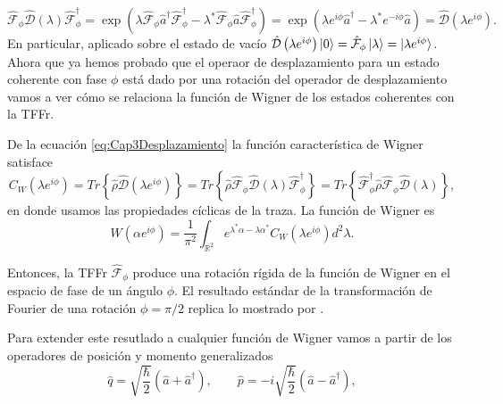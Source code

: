                 \begin{equation}\label{eq:Cap3Desplazamiento}
                    \hat{\mathcal{F}}_\phi \hat{\mathcal{D}}(\lambda) \hat{\mathcal{F}}_\phi^\dagger = \exp\left(\lambda \hat{\mathcal{F}}_\phi \hat{a}^\dagger \hat{\mathcal{F}}_\phi^\dagger - \lambda^* \hat{\mathcal{F}}_\phi \hat{a}\hat{\mathcal{F}}_\phi^\dagger \right) = \exp\left( \lambda e^{i\phi}\hat{a}^\dagger - \lambda^* e^{-i\phi} \hat{a} \right) = \hat{\mathcal{D}}\left(\lambda e^{i\phi} \right).
                \end{equation}
                En particular, aplicado sobre el estado de vacío $\hat{\mathcal{D}}\left(\lambda e^{i\phi} \right)\ket{0} = \hat{\mathcal{F}}_\phi \ket{\lambda} = \ket{\lambda e^{i\phi}}$. Ahora que ya hemos probado que el operaor de desplazamiento para un estado coherente con fase $\phi$ está dado por una rotación del operador de desplazamiento vamos a ver cómo se relaciona la función de Wigner de los estados coherentes con la TFFr.

                De la ecuación \ref{eq:Cap3Desplazamiento} la función característica de Wigner \cite{agarwal1968c} satisface
                \begin{equation*}
                    C_W\left(\lambda e^{i\phi} \right) = Tr \left\{ \hat{\rho}\hat{\mathcal{D}}\left(\lambda e^{i\phi} \right) \right\} = Tr\left\{\hat{\rho} \hat{\mathcal{F}}_\phi \hat{\mathcal{D}}(\lambda)\hat{\mathcal{F}}_\phi^\dagger \right\} = Tr\left\{\hat{\mathcal{F}}_\phi^\dagger \hat{\rho}\hat{\mathcal{F}}_\phi \hat{\mathcal{D}}(\lambda) \right\},
                \end{equation*}
                en donde usamos las propiedades cíclicas de la traza. La función de Wigner \cite{hillery1984distribution} es
                \begin{equation}
                    W\left( \alpha e^{i\phi} \right) = \frac{1}{\pi^2}\int_{\mathbb{R}^2}e^{\lambda^*\alpha - \lambda \alpha^*}C_W\left(\lambda e^{i\phi} \right)d^2\lambda.
                \end{equation}

                Entonces, la TFFr $\hat{\mathcal{F}}_\phi$ produce una rotación rígida de la función de Wigner en el espacio de fase de un ángulo $\phi$. El resultado estándar de la transformación de Fourier de una rotación $\phi = \pi/2$ replica lo mostrado por \cite{lohmann1993image}. 

                Para extender este resutlado a cualquier función de Wigner vamos a partir de los operadores de posición y momento generalizados
                \begin{equation}\label{eq:Cap3QP}
                    \hat{q} = \sqrt{\frac{\hbar}{2}}\left(\hat{a} + \hat{a}^\dagger \right), \qquad \hat{p} = -i \sqrt{\frac{\hbar}{2}} \left(\hat{a} - \hat{a}^\dagger \right),
                \end{equation}

